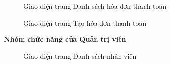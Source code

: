 \begin{figure}[H]
    \begin{center}
        \caption{Giao diện trang Danh sách hóa đơn thanh toán}
        \label{result_danh_sach_hoa_don_thanh_toan}
    \end{center}
\end{figure}

\begin{figure}[H]
    \begin{center}
        \caption{Giao diện trang Tạo hóa đơn thanh toán}
        \label{result_tao_hoa_don_thanh_toan}
    \end{center}
\end{figure}

\textbf{Nhóm chức năng của Quản trị viên}

\begin{figure}[H]
    \begin{center}
        \caption{Giao diện trang Danh sách nhân viên}
        \label{result_danh_sach_nhan_vien}
    \end{center}
\end{figure}

